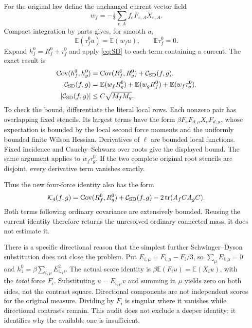 \documentclass[11pt,letterpaper]{article}
\theoremstyle{remark}\newtheorem{remark}[theorem]{Remark}
\newcommand{\E}{\mathbb E}
\newcommand{\tr}{\operatorname{tr}}\newcommand{\Tr}{\operatorname{Tr}}
\newcommand{\cK}{\mathcal K}\newcommand{\cC}{\mathcal C}
\begin{document}
For the original law define the unchanged current vector field
\[
 w_f=-\tfrac13\sum_{e,A}f_eF_{e,A}X_{e,A}.
\]
Compact integration by parts gives, for smooth \(u\),
\begin{equation}\label{eq:SD}
 \E(\tau_f^0u)=\E(w_fu),\qquad \E\tau_f^0=0.
\end{equation}
Expand \(h_f^0=R_f^0+\tau_f^0\) and apply \eqref{eq:SD} to each term containing a current. The exact result is
\begin{align}\label{eq:SDstop}
 \Cov(h_f^0,h_g^0)&=\Cov(R_f^0,R_g^0)+\mathcal C_{\rm SD}(f,g),\\
 \mathcal C_{\rm SD}(f,g)&=\E(w_fR_g^0)+\E(w_gR_f^0)+\E(w_f\tau_g^0),\nonumber\\
 |\mathcal C_{\rm SD}(f,g)|&\le C\sqrt{M_fM_g}.\nonumber
\end{align}
To check the bound, differentiate the literal local rows. Each nonzero pair has overlapping fixed stencils. Its largest terms have the form
\(\beta F_eF_{d;\mu}X_eF_{d;\mu}\), whose expectation is bounded by the local second force moments and the uniformly bounded finite Wilson Hessian. Derivatives of \(\ell\) are bounded local functions. Fixed incidence and Cauchy--Schwarz over roots give the displayed bound. The same argument applies to \(w_f\tau_g^0\). If the two complete original root stencils are disjoint, every derivative term vanishes exactly.

Thus the new four-force identity also has the form
\begin{equation}\label{eq:SDkappa}
 \cK_4(f,g)=\Cov(R_f^0,R_g^0)+\mathcal C_{\rm SD}(f,g)
              -2\tr(A_fCA_gC).
\end{equation}
Both terms following ordinary covariance are extensively bounded. Reusing the current identity therefore returns the unresolved ordinary connected mass; it does not estimate it.

There is a specific directional reason that the simplest further Schwinger--Dyson substitution does not close the problem. Put \(E_{i,\mu}=F_{i,\mu}-F_i/3\), so \(\sum_\mu E_{i,\mu}=0\) and
\(h_1^0=\beta\sum_{i,\mu}E_{i,\mu}^2\). The actual score identity is
\(\beta\E(F_iu)=\E(X_iu)\), with the \emph{total} force \(F_i\). Substituting \(u=E_{i,\mu}v\) and summing in \(\mu\) yields zero on both sides, not the contrast square. Directional components are not independent scores for the original measure. Dividing by \(F_i\) is singular where it vanishes while directional contrasts remain. This audit does not exclude a deeper identity; it identifies why the available one is insufficient.
\end{document}
